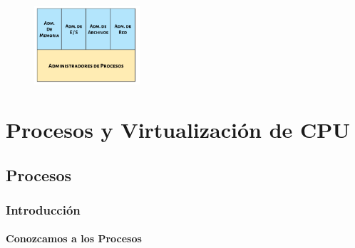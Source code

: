 \documentclass[12pt, fleqn]{report}                             %
\begin{document}
            \begin{figure}[h!]
                \centering
                \includegraphics[width=0.35\textwidth]{PartesDelKernel}
            \end{figure}





\part{Procesos y Virtualización de CPU}
\clearpage


    \chapter{Procesos}

        \clearpage
        \section{Introducción}

            \clearpage
            \subsection{Conozcamos a los Procesos}
\end{document}
